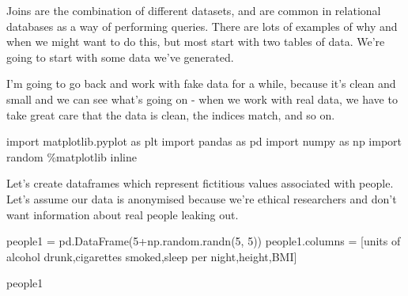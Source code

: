 \documentclass[
  letterpaper,
  DIV=11,
  numbers=noendperiod]{scrreprt}
\newenvironment{Shaded}{\begin{snugshade}}{\end{snugshade}}
\newcommand{\DecValTok}[1]{\textcolor[rgb]{0.68,0.00,0.00}{#1}}
\newcommand{\ImportTok}[1]{\textcolor[rgb]{0.00,0.46,0.62}{#1}}
\newcommand{\NormalTok}[1]{\textcolor[rgb]{0.00,0.23,0.31}{#1}}
\newcommand{\OperatorTok}[1]{\textcolor[rgb]{0.37,0.37,0.37}{#1}}
\newcommand{\StringTok}[1]{\textcolor[rgb]{0.13,0.47,0.30}{#1}}
\begin{document}
Joins are the combination of different datasets, and are common in
relational databases as a way of performing queries. There are lots of
examples of why and when we might want to do this, but most start with
two tables of data. We're going to start with some data we've generated.

I'm going to go back and work with fake data for a while, because it's
clean and small and we can see what's going on - when we work with real
data, we have to take great care that the data is clean, the indices
match, and so on.

\begin{Shaded}
\begin{Highlighting}[]
\ImportTok{import}\NormalTok{ matplotlib.pyplot }\ImportTok{as}\NormalTok{ plt}
\ImportTok{import}\NormalTok{ pandas }\ImportTok{as}\NormalTok{ pd}
\ImportTok{import}\NormalTok{ numpy }\ImportTok{as}\NormalTok{ np}
\ImportTok{import}\NormalTok{ random}
\OperatorTok{\%}\NormalTok{matplotlib inline}
\end{Highlighting}
\end{Shaded}

Let's create dataframes which represent fictitious values associated
with people. Let's assume our data is anonymised because we're ethical
researchers and don't want information about real people leaking out.

\begin{Shaded}
\begin{Highlighting}[]
\NormalTok{people1 }\OperatorTok{=}\NormalTok{ pd.DataFrame(}\DecValTok{5}\OperatorTok{+}\NormalTok{np.random.randn(}\DecValTok{5}\NormalTok{, }\DecValTok{5}\NormalTok{))}
\NormalTok{people1.columns }\OperatorTok{=}\NormalTok{ [}\StringTok{\textquotesingle{}units of alcohol drunk\textquotesingle{}}\NormalTok{,}\StringTok{\textquotesingle{}cigarettes smoked\textquotesingle{}}\NormalTok{,}\StringTok{\textquotesingle{}sleep per night\textquotesingle{}}\NormalTok{,}\StringTok{\textquotesingle{}height\textquotesingle{}}\NormalTok{,}\StringTok{\textquotesingle{}BMI\textquotesingle{}}\NormalTok{]}
\end{Highlighting}
\end{Shaded}

\begin{Shaded}
\begin{Highlighting}[]
\NormalTok{people1}
\end{Highlighting}
\end{Shaded}
\end{document}
